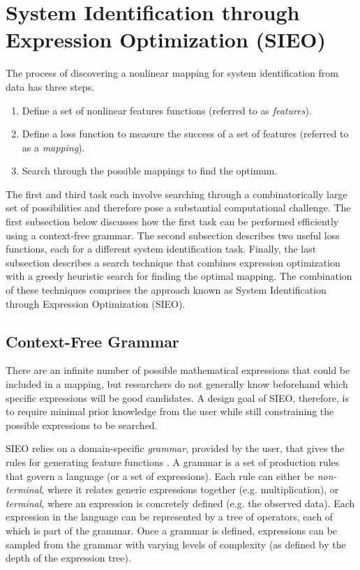\documentclass{article}
\begin{document}
\section{System Identification through Expression Optimization (SIEO)}
\label{sieo}
The process of discovering a nonlinear mapping for system identification from data has three steps.
\begin{enumerate}
    \item Define a set of nonlinear features functions (referred to as \emph{features}).
    \item Define a loss function to measure the success of a set of features (referred to as a \textit{mapping}).
    \item Search through the possible mappings to find the optimum.
\end{enumerate}
The first and third task each involve searching through a combinatorically large set of possibilities and therefore pose a substantial computational challenge. The first subsection below discusses how the first task can be performed efficiently using a context-free grammar. The second subsection describes two useful loss functions, each for a different system identification task. Finally, the last subsection describes a search technique that combines expression optimization with a greedy heuristic search for finding the optimal mapping. The combination of these techniques comprises the approach known as System Identification through Expression Optimization (SIEO).

\subsection{Context-Free Grammar}

There are an infinite number of possible mathematical expressions that could be included in a mapping, but researchers do not generally know beforehand which specific expressions will be good candidates. A design goal of SIEO, therefore, is to require minimal prior knowledge from the user while still constraining the possible expressions to be searched.

SIEO relies on a domain-specific \textit{grammar}, provided by the user, that gives the rules for generating feature functions \cite{kochenderfer2019algorithms}. A grammar is a set of production rules that govern a language (or a set of expressions). Each rule can either be \textit{non-terminal}, where it relates generic expressions together (e.g. multiplication), or \textit{terminal}, where an expression is concretely defined (e.g. the observed data). Each expression in the language can be represented by a tree of operators, each of which is part of the grammar. Once a grammar is defined, expressions can be sampled from the grammar with varying levels of complexity (as defined by the depth of the expression tree).
\end{document}

